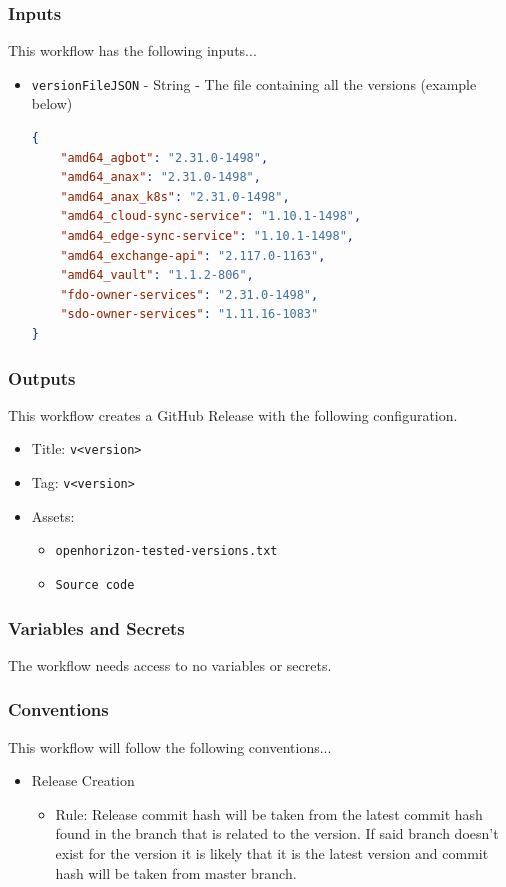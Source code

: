 \documentclass[a4paper,11pt]{article}
\begin{document}
\subsubsection{Inputs}
This workflow has the following inputs...
\begin{itemize}
    \item\verb|versionFileJSON| - String - The file containing all the versions (example below)
    \begin{lstlisting}[language=json]
{   
    "amd64_agbot": "2.31.0-1498",
    "amd64_anax": "2.31.0-1498",
    "amd64_anax_k8s": "2.31.0-1498",
    "amd64_cloud-sync-service": "1.10.1-1498",
    "amd64_edge-sync-service": "1.10.1-1498",
    "amd64_exchange-api": "2.117.0-1163",
    "amd64_vault": "1.1.2-806",
    "fdo-owner-services": "2.31.0-1498",
    "sdo-owner-services": "1.11.16-1083"
}
    \end{lstlisting}

\end{itemize}

\subsubsection{Outputs}
This workflow creates a GitHub Release with the following configuration.
\begin{itemize}
    \item Title: \verb|v<version>|
    \item Tag: \verb|v<version>|
    \item Assets:
    \begin{itemize}
        \item\verb|openhorizon-tested-versions.txt|
        \item\verb|Source code|
    \end{itemize}
\end{itemize}

\subsubsection{Variables and Secrets}
The workflow needs access to no variables or secrets.

\subsubsection{Conventions}
This workflow will follow the following conventions...
\begin{itemize}
    \item Release Creation
    \begin{itemize}
        \item Rule: Release commit hash will be taken from the latest commit hash found in the branch that is related to the version. If said branch doesn't exist for the version it is likely that it is the latest version and commit hash will be taken from master branch.
    \end{itemize}
\end{itemize}
\end{document}
